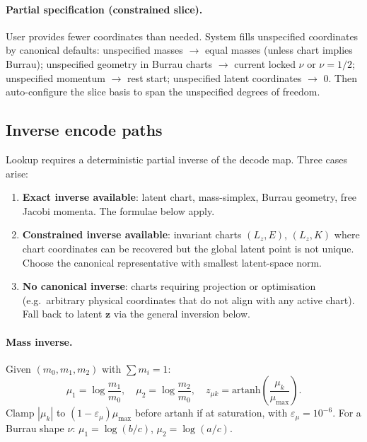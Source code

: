 \documentclass[11pt]{report}
\begin{document}
\paragraph{Partial specification (constrained slice).} User provides fewer coordinates than needed. System fills unspecified coordinates by canonical defaults: unspecified masses $\to$ equal masses (unless chart implies Burrau); unspecified geometry in Burrau charts $\to$ current locked $\nu$ or $\nu=1/2$; unspecified momentum $\to$ rest start; unspecified latent coordinates $\to$ 0. Then auto-configure the slice basis to span the unspecified degrees of freedom.

\subsection{Inverse encode paths}
\label{sec:inverse_encode}

Lookup requires a deterministic partial inverse of the decode map. Three cases arise:
\begin{enumerate}[nosep]
\item \textbf{Exact inverse available}: latent chart, mass-simplex, Burrau geometry, free Jacobi momenta. The formulae below apply.
\item \textbf{Constrained inverse available}: invariant charts $(L_z,E)$, $(L_z,K)$ where chart coordinates can be recovered but the global latent point is not unique. Choose the canonical representative with smallest latent-space norm.
\item \textbf{No canonical inverse}: charts requiring projection or optimisation (e.g.\ arbitrary physical coordinates that do not align with any active chart). Fall back to latent $\mathbf z$ via the general inversion below.
\end{enumerate}

\paragraph{Mass inverse.} Given $(m_0,m_1,m_2)$ with $\sum m_i=1$:
\[
\mu_1=\log\frac{m_1}{m_0},\quad \mu_2=\log\frac{m_2}{m_0},\quad z_{\mu k}=\mathrm{artanh}\!\left(\frac{\mu_k}{\mu_{\max}}\right).
\]
Clamp $|\mu_k|$ to $(1-\varepsilon_\mu)\mu_{\max}$ before artanh if at saturation, with $\varepsilon_\mu=10^{-6}$. For a Burrau shape $\nu$: $\mu_1=\log(b/c)$, $\mu_2=\log(a/c)$.
\end{document}
